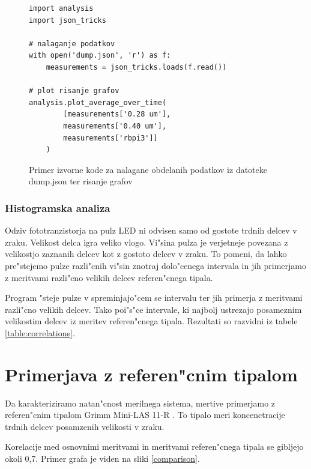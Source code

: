 \documentclass[11pt,a4paper]{article}
\begin{document}
\begin{figure}[H]
	\begin{lstlisting}[frame=single]
import analysis
import json_tricks

# nalaganje podatkov
with open('dump.json', 'r') as f:
	measurements = json_tricks.loads(f.read())

# plot risanje grafov
analysis.plot_average_over_time(
		[measurements['0.28 um'],
		measurements['0.40 um'],
		measurements['rbpi3']]
	)

	\end{lstlisting}
	\caption{Primer izvorne kode za nalagane obdelanih podatkov iz datoteke dump.json ter risanje grafov}
	\label{plot-data}
\end{figure}


\subsubsection{Histogramska analiza}
Odziv fototranzistorja na pulz LED ni odvisen samo od gostote trdnih delcev v zraku. Velikost delca igra veliko vlogo. Vi"sina pulza je verjetneje povezana z velikostjo zaznanih delcev kot z gostoto delcev v zraku. To pomeni, da lahko pre"stejemo pulze razli"cnih vi"sin znotraj dolo"cenega intervala in jih primerjamo z meritvami razli"cno velikih delcev referen"cnega tipala.

Program "steje pulze v spreminjajo"cem se intervalu ter jih primerja z meritvami razli"cno velikih delcev. Tako poi"s"ce intervale, ki najbolj ustrezajo posameznim velikostim delcev iz meritev referen"cnega tipala. Rezultati so razvidni iz tabele \ref{table:correlations}.

\clearpage
\section{Primerjava z referen"cnim tipalom}
Da karakteriziramo natan"cnost merilnega sistema, mertive primerjamo z referen"cnim tipalom Grimm Mini-LAS 11-R \cite{grimm-min-las}. To tipalo meri koncenctracije trdnih delcev posamzenih velikosti v zraku.

Korelacije med osnovnimi meritvami in meritvami referen"cnega tipala se gibljejo okoli 0,7. Primer grafa je viden na sliki \ref{comparison}.
\end{document}
